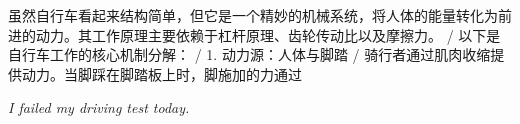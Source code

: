 \begin{multicols}{2}
虽\allowbreak{}然\allowbreak{}自\allowbreak{}行\allowbreak{}车\allowbreak{}看\allowbreak{}起\allowbreak{}来\allowbreak{}结\allowbreak{}构\allowbreak{}\allowbreak{}简\allowbreak{}单\allowbreak{}，\allowbreak{}但\allowbreak{}它\allowbreak{}是\allowbreak{}一\allowbreak{}个\allowbreak{}精\allowbreak{}妙\allowbreak{}\allowbreak{}的\allowbreak{}机\allowbreak{}械\allowbreak{}系\allowbreak{}统\allowbreak{}，\allowbreak{}将\allowbreak{}人\allowbreak{}体\allowbreak{}的\allowbreak{}\allowbreak{}能\allowbreak{}量\allowbreak{}转\allowbreak{}化\allowbreak{}为\allowbreak{}前\allowbreak{}进\allowbreak{}的\allowbreak{}动\allowbreak{}力\allowbreak{}\allowbreak{}。\allowbreak{}其\allowbreak{}工\allowbreak{}作\allowbreak{}原\allowbreak{}理\allowbreak{}主\allowbreak{}要\allowbreak{}依\allowbreak{}赖\allowbreak{}\allowbreak{}于\allowbreak{}杠\allowbreak{}杆\allowbreak{}原\allowbreak{}理\allowbreak{}、\allowbreak{}齿\allowbreak{}轮\allowbreak{}传\allowbreak{}动\allowbreak{}\allowbreak{}比\allowbreak{}以\allowbreak{}及\allowbreak{}摩\allowbreak{}擦\allowbreak{}力\allowbreak{}。\allowbreak{} / 以\allowbreak{}下\allowbreak{}是\allowbreak{}自\allowbreak{}行\allowbreak{}车\allowbreak{}工\allowbreak{}作\allowbreak{}的\allowbreak{}核\allowbreak{}心\allowbreak{}机\allowbreak{}制\allowbreak{}分\allowbreak{}解\allowbreak{}：\allowbreak{} / 1. 动\allowbreak{}力\allowbreak{}源\allowbreak{}：\allowbreak{}人\allowbreak{}体\allowbreak{}与\allowbreak{}脚\allowbreak{}踏\allowbreak{} / 骑\allowbreak{}行\allowbreak{}者\allowbreak{}通\allowbreak{}过\allowbreak{}肌\allowbreak{}肉\allowbreak{}收\allowbreak{}缩\allowbreak{}提\allowbreak{}\allowbreak{}供\allowbreak{}动\allowbreak{}力\allowbreak{}。\allowbreak{}当\allowbreak{}脚\allowbreak{}踩\allowbreak{}在\allowbreak{}脚\allowbreak{}踏\allowbreak{}\allowbreak{}板\allowbreak{}上\allowbreak{}时\allowbreak{}，\allowbreak{}脚\allowbreak{}施\allowbreak{}加\allowbreak{}的\allowbreak{}力\allowbreak{}通\allowbreak{}\allowbreak{}过\allowbreak{}\par\noindent\textit{I failed my driving test today.}\enspace 
\end{multicols}
